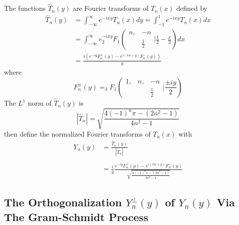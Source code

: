 \documentclass{article}
\begin{document}
The functions $\hat{T}_n (y)$ are Fourier transforms of $T_n (x)$ defined by
\begin{equation}
  \begin{array}{ll}
    \hat{T}_n (y) & = \int_{- \infty}^{\infty} e^{- ix y} T_n (x) dy = \int_{-
    1}^1 e^{- ix y} T_n (x) dx\\
    & = \int_{- \infty}^{\infty} e^{- ix y} _2 F_1 \left( \begin{array}{cc}
      n, & - n\\
      & \frac{1}{2}
    \end{array} | \frac{1}{2} - \frac{x}{2} \right)   dx\\
    & = \frac{i (e^{- i y} F^+_n (y) - e^{i (\pi n + y)} F_n^- (y))}{y} 
  \end{array}
\end{equation}
where
\begin{equation}
  F_n^{\pm} (y) =_3 F_1 \left( \begin{array}{ccc}
    1, & n, & - n\\
    &  & \frac{1}{2}
  \end{array} | \frac{\pm i y}{2} \right)
\end{equation}
The $L^1$ norm of $\hat{T}_n (y)$ is
\begin{equation}
  | \hat{T}_n | = \sqrt{\frac{4 (- 1)^n \pi - (2 n^2 - 1)}{4 n^2 - 1}}
\end{equation}
then define the normalized Fourier transforms of $T_n (x)$ with
\begin{equation}
  \begin{array}{ll}
    Y_n (y) & = \frac{\hat{T}_n (y)}{| \hat{T}_n |}\\
    & \\
    & = \frac{i}{y} \frac{e^{- i y} F^+_n (y) - e^{i (\pi n + y)} F_n^-
    (y)}{\sqrt{\frac{4 (- 1)^n \pi - (2 n^2 - 1)}{4 n^2 - 1}}}
  \end{array}
\end{equation}
\subsection{The Orthogonalization $Y^{\perp}_n (y)$ of $Y _n (y)$ Via The
Gram-Schmidt Process}
\end{document}
